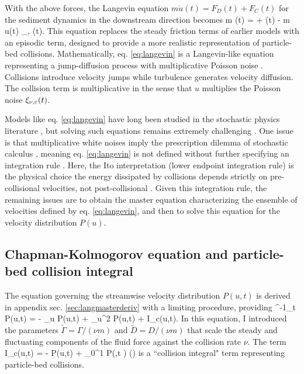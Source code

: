 With the above forces, the Langevin equation $m\dot{u}(t) = F_D(t) + F_C(t)$ for the sediment dynamics in the downstream direction becomes
\be m (t) = \Gamma + \eta(t) - m u(t) \xi_{\nu, \ve}(t). \label{eq:langevin} \ee
This equation replaces the steady friction terms of earlier models with an episodic term, designed to provide a more realistic representation of particle-bed collisions.
Mathematically, eq. \ref{eq:langevin} is a Langevin-like equation representing a jump-diffusion process \citep{Daly2006} with multiplicative Poisson noise \citep{Dubkov2016,Denisov2009}. 
Collisions introduce velocity jumps while turbulence generates velocity diffusion. The collision term is multiplicative in the sense that $u$ multiplies the Poisson noise $\xi_{\nu,\varepsilon}(t)$.

Models like eq. \ref{eq:langevin} have long been studied in the stochastic physics literature \citep{Hanggi1978,VanDenBroeck1983}, but solving such equations remains extremely challenging \citep{Daly2010,Mau2014,Dubkov2019}.
One issue is that multiplicative white noises imply the prescription dilemma of stochastic calculus \citep{Risken1989,Gardiner1983}, meaning eq. \ref{eq:langevin} is not defined without further specifying an integration rule \citep{Suweis2011}.
Here, the Ito interpretation (lower endpoint integration rule) is the physical choice the energy dissipated by collisions depends strictly on pre-collisional velocities, not post-collisional \citep[e.g.][]{Gardiner1983}.
Given this integration rule, the remaining issues are to obtain the master equation characterizing the ensemble of velocities defined by eq. \ref{eq:langevin}, and then to solve this equation for the velocity distribution $P(u)$.

\subsection{Chapman-Kolmogorov equation and particle-bed collision integral}

The equation governing the streamwise velocity distribution $P(u,t)$ is derived in appendix sec. \ref{sec:langmasterderiv} with a limiting procedure, providing
\be \nu^{-1}\partial_t P(u,t) = - \tilde{\Gamma} \partial_u P(u,t) +  \partial_u^2 P(u,t) + I_c(u,t). \label{eq:master} \ee
In this equation, I introduced the parameters $\tilde{\Gamma} = \Gamma/(\nu m)$ and $\tilde{D} = D/(\nu m)$ that scale the steady and fluctuating components of the fluid force against the collision rate $\nu$. The term
\be I_c(u,t) = - P(u,t) + \int_0^1 P\big(,t \big) \rho(\ve) \label{eq:colint} \ee
is a ``collision integral" term representing particle-bed collisions.

